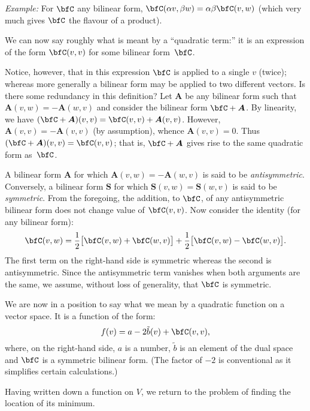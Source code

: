 \documentclass[10pt, a4paper]{article}
\newcommand{\eg}{\emph{Example:}}
\begin{document}
\eg{} For $\bfC$ any bilinear form,
$\bfC(\alpha v, \beta w) = \alpha\beta \bfC(v,w)$ (which very much gives
$\bfC$ the flavour of a product).

We can now say roughly what is meant by a “quadratic term:” it is an
expression of the form $\bfC(v,v)$ for some bilinear form~$\bfC$.

Notice, however, that in this expression $\bfC$ is applied to a single
$v$ (twice); whereas more generally a bilinear form may be applied to
two different vectors. Is there some redundancy in this definition?
Let $\bm{A}$ be any bilinear form such that $\bm{A}(v,w)=-\bm{A}(w,v)$ and consider
the bilinear form $\bfC+\bm{A}$. By linearity, we have $(\bfC+\bm{A})(v, v) =
\bfC(v,v)+\bm{A}(v,v)$. However, $\bm{A}(v,v)=-\bm{A}(v,v)$ (by assumption), whence
$\bm{A}(v,v)=0$. Thus $(\bfC+\bm{A})(v,v)=\bfC(v,v)$; that is, $\bfC+\bm{A}$ gives rise to the
same quadratic form as~$\bfC$.

A bilinear form $\bm{A}$ for which $\bm{A}(v,w)=-\bm{A}(w,v)$ is said
to be \emph{antisymmetric}. Conversely, a bilinear form $\bm{S}$ for
which $\bm{S}(v,w)=\bm{S}(w,v)$ is said to be \emph{symmetric}. From
the foregoing, the addition, to $\bfC$, of any antisymmetric bilinear
form does not change value of $\bfC(v,v)$. Now consider the identity
(for any bilinear form):
\[
  \bfC(v, w) = \frac{1}{2}\bigl[\bfC(v,w) + \bfC(w,v)\bigr]
  + \frac{1}{2}\bigl[\bfC(v,w) - \bfC(w,v)\bigr].
\]
The first term on the right-hand side is symmetric whereas the second
is antisymmetric. Since the antisymmetric term vanishes when both
arguments are the same, we assume, without loss of generality, that
$\bfC$ is symmetric.

We are now in a position to say what we mean by a quadratic function on
a vector space. It is a function of the form:
\begin{equation}
  f(v) = a - 2\tilde{b}(v) + \bfC(v, v),
  \label{eq:quadratic-function}
\end{equation}
where, on the right-hand side, $a$ is a number, $\tilde{b}$ is an element
of the dual space and $\bfC$ is a symmetric bilinear form. (The factor of
$-2$ is conventional as it simplifies certain calculations.)

Having written down a function on $V$, we return to the problem of
finding the location of its minimum.
\end{document}
